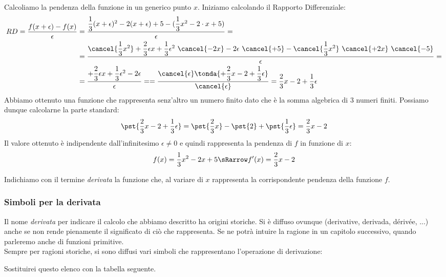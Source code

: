 Calcoliamo la pendenza della funzione in un generico punto \(x\).
Iniziamo calcolando il Rapporto Differenziale:
\begin{align*}RD = \dfrac{f(x + \epsilon) - f(x)}{\epsilon} &=
  \dfrac{\dfrac{1}{3}(x+\epsilon)^2-2(x+\epsilon) + 5 - 
          (\dfrac{1}{3}x^2-2\cdot x+5)}
        {\epsilon} = \\
&= \dfrac{\cancel{\dfrac{1}{3}x^2}+\dfrac{2}{3} \epsilon x 
          +\dfrac{1}{3}\epsilon^2~\cancel{-2x}-2\epsilon~\cancel{+5} - 
          \cancel{\dfrac{1}{3}x^2}~\cancel{+2x}~\cancel{-5}}
         {\epsilon}=\\
&= \dfrac{+\dfrac{2}{3} \epsilon x 
          +\dfrac{1}{3}\epsilon^2-2\epsilon}
         {\epsilon}=
= \dfrac{\cancel{\epsilon} \tonda{+\dfrac{2}{3}x -2+\dfrac{1}{3}\epsilon}}
        {\cancel{\epsilon}}=
\dfrac{2}{3}x-2+\dfrac{1}{3}\epsilon
\end{align*}
Abbiamo ottenuto una funzione che rappresenta senz'altro un numero finito 
dato che è la somma algebrica di 3 numeri finiti.
Possiamo dunque calcolarne la parte standard:
\[\pst{\dfrac{2}{3}x-2+\dfrac{1}{3}\epsilon}=
  \pst{\dfrac{2}{3}x}-\pst{2}+\pst{\dfrac{1}{3}\epsilon}=
  \dfrac{2}{3}x-2\]
Il valore ottenuto è indipendente dall'infinitesimo \(\epsilon \neq 0\) 
e quindi rappresenta la pendenza di \(f\) in funzione di \(x\):
\[f(x) = \dfrac{1}{3}x^2-2x+5 \sRarrow f'(x) = \dfrac{2}{3}x-2\]

\begin{definizione}
Indichiamo con il termine \emph{derivata} la funzione che, al variare di 
\(x\) rappresenta la corrispondente pendenza della funzione \(f\).
\end{definizione}


\subsubsection{Simboli per la derivata}
Il nome \emph{derivata} per indicare il calcolo che abbiamo descritto ha 
origini storiche. Si è diffuso  ovunque (derivative, derivada, dérivée, 
...) anche se non rende pienamente il significato di ciò che rappresenta. 
Se ne potrà intuire la ragione in un capitolo successivo, quando parleremo 
anche di funzioni primitive.\\
Sempre per ragioni storiche, si sono diffusi vari simboli che rappresentano 
l'operazione di derivazione:

Sostituirei questo elenco con la tabella seguente.

